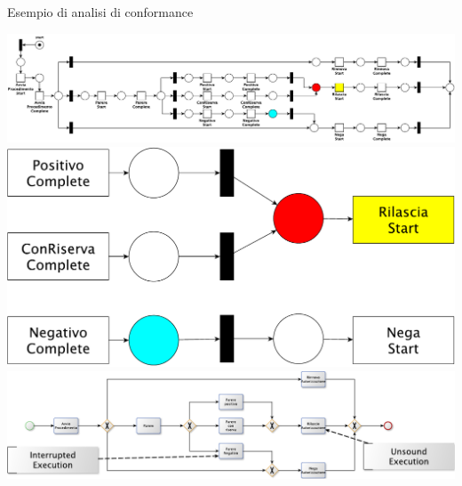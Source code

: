 \documentclass[10pt]{beamer}
\begin{document}
	
	
	
	\begin{frame}{}
	  Esempio di analisi di conformance
	  \begin{center}
	    \includegraphics[scale=0.50]{./fig/animazioneconf/ConfPNfinal}\\[10pt]
	    \includegraphics[scale=0.20]{./fig/animazioneconf/ConfPNz}\\[10pt]
	    \includegraphics[scale=0.50]{./fig/animazioneconf/BPMNConf}
	  \end{center}
	\end{frame}
	
\end{document}
